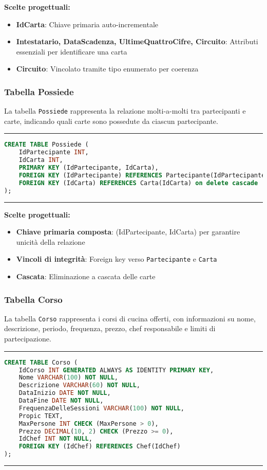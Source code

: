 \textbf{Scelte progettuali:}
\begin{itemize}
    \item \textbf{IdCarta}: Chiave primaria auto-incrementale
    \item \textbf{Intestatario, DataScadenza, UltimeQuattroCifre, Circuito}: Attributi essenziali per identificare una carta
    \item \textbf{Circuito}: Vincolato tramite tipo enumerato per coerenza
\end{itemize}

\subsubsection{Tabella Possiede}

La tabella \texttt{Possiede} rappresenta la relazione molti-a-molti tra partecipanti e carte, indicando quali carte sono possedute da ciascun partecipante.

\noindent\rule{\textwidth}{0.4pt}
\begin{lstlisting}[language=SQL, style=sqlstyle]
CREATE TABLE Possiede (
    IdPartecipante INT,
    IdCarta INT,
    PRIMARY KEY (IdPartecipante, IdCarta),
    FOREIGN KEY (IdPartecipante) REFERENCES Partecipante(IdPartecipante),
    FOREIGN KEY (IdCarta) REFERENCES Carta(IdCarta) on delete cascade 
);
\end{lstlisting}
\noindent\rule{\textwidth}{0.4pt}

\textbf{Scelte progettuali:}
\begin{itemize}
    \item \textbf{Chiave primaria composta}: (IdPartecipante, IdCarta) per garantire unicità della relazione
    \item \textbf{Vincoli di integrità}: Foreign key verso \texttt{Partecipante} e \texttt{Carta}
    \item \textbf{Cascata}: Eliminazione a cascata delle carte
\end{itemize}

\subsubsection{Tabella Corso}

La tabella \texttt{Corso} rappresenta i corsi di cucina offerti, con informazioni su nome, descrizione, periodo, frequenza, prezzo, chef responsabile e limiti di partecipazione.

\noindent\rule{\textwidth}{0.4pt}
\begin{lstlisting}[language=SQL, style=sqlstyle]
CREATE TABLE Corso (
    IdCorso INT GENERATED ALWAYS AS IDENTITY PRIMARY KEY,
    Nome VARCHAR(100) NOT NULL,
    Descrizione VARCHAR(60) NOT NULL,
    DataInizio DATE NOT NULL,
    DataFine DATE NOT NULL,
    FrequenzaDelleSessioni VARCHAR(100) NOT NULL,
    Propic TEXT,
    MaxPersone INT CHECK (MaxPersone > 0),
    Prezzo DECIMAL(10, 2) CHECK (Prezzo >= 0),
    IdChef INT NOT NULL,
    FOREIGN KEY (IdChef) REFERENCES Chef(IdChef)
);
\end{lstlisting}
\noindent\rule{\textwidth}{0.4pt}

